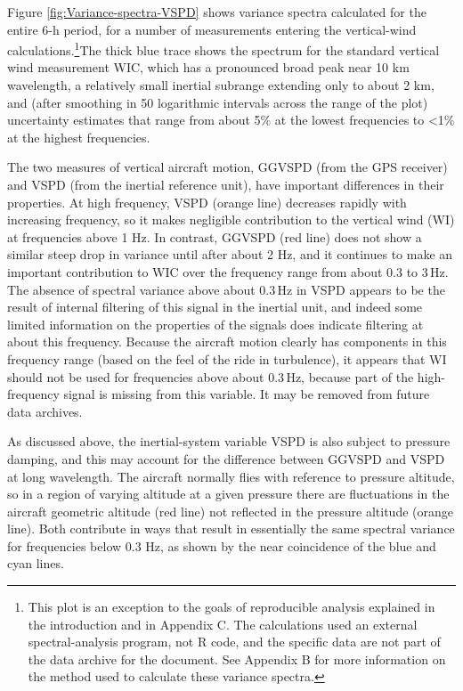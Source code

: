 \documentclass[12pt,twoside,english]{article}\usepackage[]{graphicx}\usepackage[]{color}
\let\OrgIndex\index
\renewcommand*{\index}[1]{\OrgIndex{#1}}
\begin{document}
Figure \ref{fig:Variance-spectra-VSPD} shows variance spectra calculated for the entire 6-h period, for a number of measurements entering the vertical-wind calculations.\footnote{This plot is an exception to the goals of \textquotedbl{}reproducible analysis\textquotedbl{} explained in the introduction and in Appendix C. The calculations used an external spectral-analysis program, not R code, and the specific data are not part of the data archive for the document. See Appendix B for more information on the method used to calculate these variance spectra.}The thick blue trace shows the spectrum for the standard vertical wind measurement WIC, which has a pronounced broad peak near 10 km wavelength, a relatively small inertial subrange extending only to about 2 km, and (after smoothing in 50 logarithmic intervals across the range of the plot) uncertainty estimates that range from about 5\% at the lowest frequencies to <1\% at the highest frequencies. 

The two measures of vertical aircraft motion, GGVSPD (from the GPS receiver) and VSPD (from the inertial reference unit), have important differences in their properties. At high frequency, VSPD (orange line) decreases rapidly with increasing frequency, so it makes negligible contribution to the vertical wind (WI) at frequencies above 1 Hz. In contrast, GGVSPD (red line) does not show a similar steep drop in variance until after about 2 Hz, and it continues to make an important contribution to WIC over the frequency range from about 0.3 to 3\,Hz. The absence of spectral variance above about 0.3\,Hz in VSPD appears to be the result of internal filtering of this signal in the inertial unit, and indeed some limited information on the properties of the signals does indicate filtering at about this frequency. Because the aircraft motion clearly has components in this frequency range (based on the feel of the ride in turbulence), it appears that WI should not be used for frequencies above about 0.3\,Hz, because part of the high-frequency signal is missing from this variable. It may be removed from future data archives.

As discussed above, the inertial-system variable VSPD is also subject to pressure damping, and this may account for the difference between GGVSPD and VSPD at long wavelength. The aircraft normally flies with reference to pressure altitude, so in a region of varying altitude at a given pressure there are fluctuations in the aircraft geometric altitude (red line) not reflected in the pressure altitude (orange line). Both contribute in ways that result in essentially the same spectral variance for frequencies below 0.3 Hz, as shown by the near coincidence of the blue and cyan lines.
\end{document}
